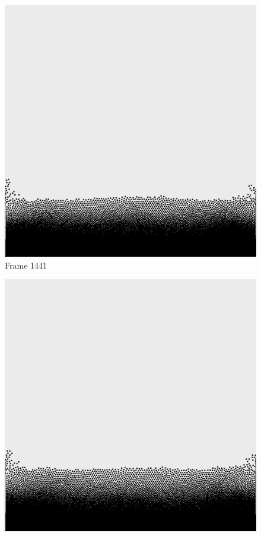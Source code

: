 \documentclass[a4paper, 12pt, oneside]{book}
\begin{document}
\begin{figure}[!ht]
    \addvspace{0.5ex}
        \begin{center}
            \includegraphics[width=\linewidth]{images/test_case_1/1441.png}
            Frame 1441
        \end{center}
    \endminipage
    \hfill
        \begin{center}
            \includegraphics[width=\linewidth]{images/test_case_1/1461.png}

\end{center}
\end{figure}
\end{document}
